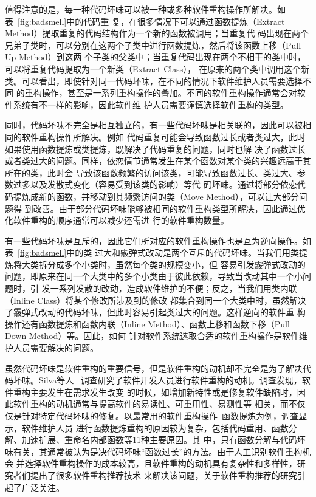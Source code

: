 值得注意的是，每一种代码坏味可以被一种或多种软件重构操作所解决。如表~\ref{fig:badsmell}中的代码重
复，在很多情况下可以通过函数提炼（Extract Method）提取重复的代码结构作为一个新的函数被调用；当重复代
码出现在两个兄弟子类时，可以分别在这两个子类中进行函数提炼，然后将该函数上移（Pull Up Method）到这两
个子类的父类中；当重复代码出现在两个不相干的类中时，可以将重复代码提取为一个新类（Extract Class），
在原来的两个类中调用这个新类。可以看出，即使针对同一代码坏味，在不同的情况下软件维护人员需要选择不同
的重构操作，甚至是一系列重构操作的叠加。不同的软件重构操作通常会对软件系统有不一样的影响，因此软件维
护人员需要谨慎选择软件重构的类型。

同时，代码坏味不完全是相互独立的，有一些代码坏味是相关联的，因此可以被相同的软件重构操作所解决。例如
代码重复可能会导致函数过长或者类过大，此时如果使用函数提炼或类提炼，既解决了代码重复的问题，同时也解
决了函数过长或者类过大的问题。同样，依恋情节通常发生在某个函数对某个类的兴趣远高于其所在的类，此时会
导致该函数频繁的访问该类，可能导致函数过长、类过大、参数过多以及发散式变化（容易受到该类的影响）等代
码坏味。通过将部分依恋代码提炼成新的函数，并移动到其频繁访问的类（Move Method），可以让大部分问题得
到改善。由于部分代码坏味能够被相同的软件重构类型所解决，因此通过优化软件重构的顺序通常可以减少还需进
行的软件重构数量。

有一些代码坏味是互斥的，因此它们所对应的软件重构操作也是互为逆向操作。如表~\ref{fig:badsmell}中的类
过大和霰弹式改动是两个互斥的代码坏味。当我们用类提炼将大类拆分成多个小类时，虽然每个类的规模变小，但
容易引发霰弹式改动的问题，即原来在同一个大类中的多个小类由于彼此依赖，导致当改动其中一个小问题时，引
发一系列发散的改动，造成软件维护的不便；反之，当我们用类内联（Inline Class）将某个修改所涉及到的修改
都集合到同一个大类中时，虽然解决了霰弹式改动的代码坏味，但此时容易引起类过大的问题。这样逆向的软件重
构操作还有函数提炼和函数内联（Inline Method）、函数上移和函数下移（Pull Down Method）等。因此，如何
针对软件系统选取合适的软件重构操作是软件维护人员需要解决的问题。

虽然代码坏味是软件重构的重要信号，但是软件重构的动机却不完全是为了解决代码坏味。Silva等人
~\cite{silva2016we}调查研究了软件开发人员进行软件重构的动机。调查发现，软件重构主要发生在需求发生改变
的时候，如增加新特性或是修复软件缺陷时，因此软件重构的动机通常与提高软件的易读性、可重用性、易测性等
相关，而不仅仅是针对特定代码坏味的修复。以最常用的软件重构操作--函数提炼为例，调查显示，软件维护人员
进行函数提炼重构的原因较为复杂，包括代码重用、函数分解、加速扩展、重命名内部函数等11种主要原因。其
中，只有函数分解与代码坏味有关，其通常被认为是决代码坏味``函数过长''的方法。由于人工识别软件重构机会
并选择软件重构操作的成本较高，且软件重构的动机具有复杂性和多样性，研究者们提出了很多软件重构推荐技术
来解决该问题，关于软件重构推荐的研究引起了广泛关注。

